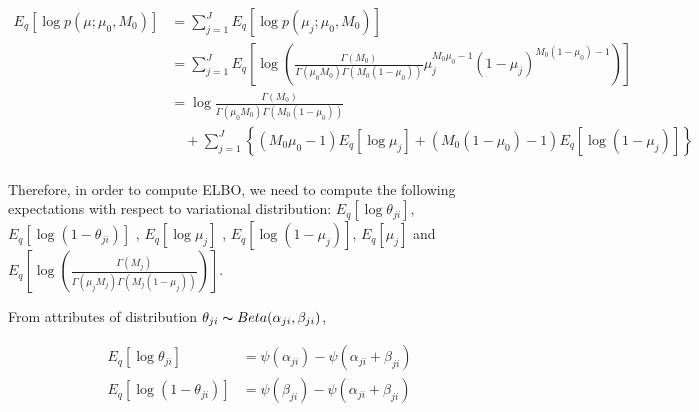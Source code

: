 \documentclass[11pt,reqno]{amsart}
\begin{document}
\begin{equation}
\begin{split}
\label{mu}
E_q \left[ \log p\left(\mu ; \mu_0, M_0 \right)\right] &= \sum_{j=1}^{J} E_q  \left[ \log p\left( \mu_j; \mu_0, M_0 \right) \right] \\
&= \sum_{j=1}^{J} E_q  \left[ \log \left( \frac{ \Gamma(M_0) } { \Gamma(\mu_0 M_0) \Gamma(M_0 (1-\mu_0)) } \mu_j^{M_0\mu_0 -1} (1 - \mu_j)^{M_0 ( 1 - \mu_0) - 1} \right) \right] \\
&= \log \frac{ \Gamma(M_0) } { \Gamma(\mu_0 M_0) \Gamma(M_0 (1-\mu_0))} \\
&\quad + \sum_{j=1}^{J} \left\lbrace (M_0\mu_0 -1)E_q  \left[ \log \mu_j \right] + (M_0 ( 1 - \mu_0) - 1) E_q  \left[ \log (1 - \mu_j)\right]\right\rbrace  \\
%
%
\end{split}
\end{equation}

Therefore, in order to compute ELBO, we need to compute the following expectations with respect to variational distribution: $ E_q \left[ \log \theta_{ji} \right] $, $ E_q\left[ \log \left( 1 - \theta_{ji}\right) \right] $ , $ E_q  \left[ \log \mu_j \right] $ , $ E_q  \left[ \log (1 - \mu_j)\right] $, $ E_q \left[ \mu_j \right] $ and $  E_q  \left[ \log \left( \frac{ \Gamma(M_j) } { \Gamma(\mu_j M_j) \Gamma(M_j (1-\mu_j)) }\right) \right] $. %


From attributes of distribution $ \theta_{ji} \thicksim Beta(\alpha_{ji}, \beta_{ji}) $,

\begin{align}
E_q \left[ \log \theta_{ji} \right] &= \psi(\alpha_{ji}) - \psi(\alpha_{ji}+\beta_{ji}) \nonumber \\
E_q\left[ \log \left( 1 - \theta_{ji}\right) \right]&= \psi(\beta_{ji}) - \psi(\alpha_{ji}+\beta_{ji}) \nonumber \nonumber \\
\end{align}
\end{document}
